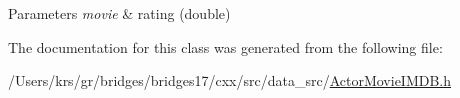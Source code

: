 \begin{DoxyParams}{Parameters}
{\em movie} & rating (double) \\
\hline
\end{DoxyParams}


The documentation for this class was generated from the following file\+:\begin{DoxyCompactItemize}
\item 
/\+Users/krs/gr/bridges/bridges17/cxx/src/data\+\_\+src/\hyperlink{_actor_movie_i_m_d_b_8h}{Actor\+Movie\+I\+M\+D\+B.\+h}\end{DoxyCompactItemize}

